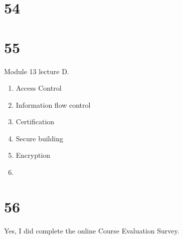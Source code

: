 \documentclass[a4paper,11pt]{article}
\begin{document}
\section*{54}


\section*{55}
Module 13 lecture D.
\begin{enumerate}
  \item  Access Control
  \item  Information flow control
  \item  Certification
  \item  Secure building
  \item  Encryption
  \item
\end{enumerate}



\section*{56}
Yes, I did complete the online Course Evaluation Survey.

\end{document}
